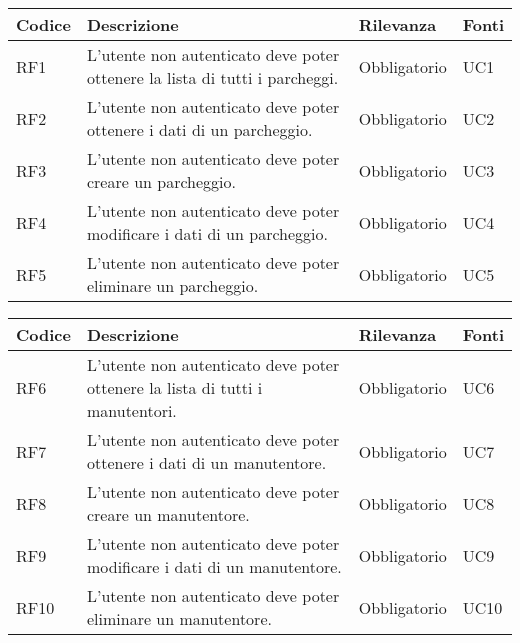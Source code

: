 \leavevmode\newline
\begin{table}
    \begin{tabular}{|p{1cm}|p{6cm}|p{1.9cm}|p{1cm}|} 
    \hline
    Codice & Descrizione & Rilevanza &  Fonti \\ 
    \hline
    RF1 & L'utente non autenticato deve poter ottenere la lista di tutti i parcheggi. & Obbligatorio & UC1 \\ 
    \hline
    RF2 & L'utente non autenticato deve poter ottenere i dati di un parcheggio. & Obbligatorio & UC2 \\ 
    \hline
    RF3 & L'utente non autenticato deve poter creare un parcheggio. & Obbligatorio & UC3 \\ 
    \hline
    RF4 & L'utente non autenticato deve poter modificare i dati di un parcheggio. & Obbligatorio & UC4 \\
    \hline
    RF5 & L'utente non autenticato deve poter eliminare un parcheggio. & Obbligatorio & UC5 \\ 
    \hline
    \end{tabular}
\end{table}

\leavevmode\newline
\begin{table}
    \begin{tabular}{|p{1cm}|p{6cm}|p{1.9cm}|p{1cm}|} 
    \hline
    Codice & Descrizione & Rilevanza &  Fonti \\ 
    \hline
    RF6 & L'utente non autenticato deve poter ottenere la lista di tutti i manutentori. & Obbligatorio & UC6 \\ 
    \hline
    RF7 & L'utente non autenticato deve poter ottenere i dati di un manutentore. & Obbligatorio & UC7 \\ 
    \hline
    RF8 & L'utente non autenticato deve poter creare un manutentore. & Obbligatorio & UC8 \\ 
    \hline
    RF9 & L'utente non autenticato deve poter modificare i dati di un manutentore. & Obbligatorio & UC9 \\
    \hline
    RF10 & L'utente non autenticato deve poter eliminare un manutentore. & Obbligatorio & UC10 \\ 
    \hline
    \end{tabular}
\end{table}

